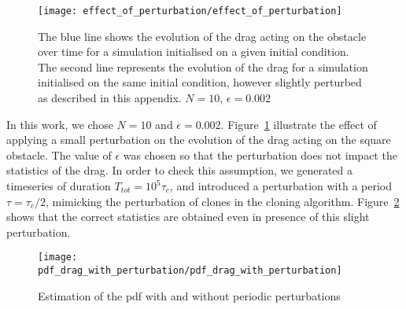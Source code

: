 \begin{figure}
  \centering
  \texttt{[image: effect\_of\_perturbation/effect\_of\_perturbation]}
  \caption[Illustration of the perturbation of the initial condition]{The blue line shows the evolution of the drag acting on the obstacle over time for a simulation initialised on a given initial condition. The second line represents the evolution of the drag for a simulation initialised on the same initial condition, however slightly perturbed as described in this appendix. $N=10$, $\epsilon=0.002$}
  \label{fig:effect_of_perturbation}
\end{figure}

In this work, we chose $N = 10$ and $\epsilon = 0.002$.
Figure~\ref{fig:effect_of_perturbation} illustrate the effect of applying a small perturbation on the evolution of the drag acting on the square obstacle.
The value of $\epsilon$ was chosen so that the perturbation does not impact the statistics of the drag.
In order to check this assumption, we generated a timeseries of duration $T_{tot} = 10^5 \tau_c$, and introduced a perturbation with a period $\tau = \tau_c / 2$, mimicking the perturbation of clones in the cloning algorithm.
Figure~\ref{fig:pdf_drag_with_perturbation} shows that the correct statistics are obtained even in presence of this slight perturbation.

\begin{figure}
  \centering
  \texttt{[image: pdf\_drag\_with\_perturbation/pdf\_drag\_with\_perturbation]}
  \caption{Estimation of the \ac{pdf} with and without periodic perturbations}
  \label{fig:pdf_drag_with_perturbation}
\end{figure}

